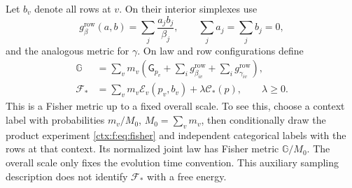 Let $b_v$ denote all rows at $v$. On their interior simplexes use
\begin{equation}
 g^{\mathrm{row}}_\beta(a,b)=\sum_j\frac{a_jb_j}{\beta_j},
 \qquad \sum_j a_j=\sum_j b_j=0,
\end{equation}
and the analogous metric for $\gamma$. On law and row configurations define
\begin{align}
 \mathbb G&=\sum_v m_v\left(\mathsf G_{p_v}+\sum_i g^{\mathrm{row}}_{\beta_{iv}}
                                  +\sum_i g^{\mathrm{row}}_{\gamma_{iv}}\right),\\
 \mathcal F_*&=\sum_v m_v\mathcal E_v(p_v,b_v)+\lambda\mathcal C_*(p),
 \qquad \lambda\geq0.
 \label{ctx:f:eq:F}
\end{align}
This is a Fisher metric up to a fixed overall scale. To see this, choose a context label with probabilities $m_v/M_0$, $M_0=\sum_vm_v$, then conditionally draw the product experiment \cref{ctx:f:eq:fisher} and independent categorical labels with the rows at that context. Its normalized joint law has Fisher metric $\mathbb G/M_0$. The overall scale only fixes the evolution time convention. This auxiliary sampling description does not identify $\mathcal F_*$ with a free energy.

